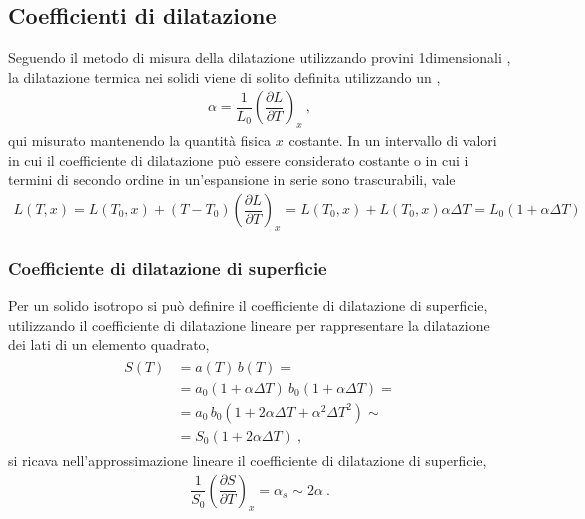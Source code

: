 \documentclass[letterpaper,10pt,italian]{jupyterBook}
\begin{document}
\subsection{Coefficienti di dilatazione}
\label{\detokenize{ch/thermodynamics/elastic-solid-1d:coefficienti-di-dilatazione}}\label{\detokenize{ch/thermodynamics/elastic-solid-1d:physics-hs-thermodynamics-matter-elastic-1d-dilation}}
\sphinxAtStartPar
Seguendo il metodo di misura della dilatazione utilizzando provini 1\sphinxhyphen{}dimensionali  , la dilatazione termica nei solidi viene di solito definita utilizzando un ,
\begin{equation*}
\begin{split}\alpha = \dfrac{1}{L_0}\left( \dfrac{\partial L}{\partial T} \right)_x \ ,\end{split}
\end{equation*}
\sphinxAtStartPar
qui misurato mantenendo la quantità fisica \(x\) costante. In un intervallo di valori in cui il coefficiente di dilatazione può essere considerato costante o in cui i termini di secondo ordine in un’espansione in serie sono trascurabili, vale
\begin{equation*}
\begin{split}L(T,x) = L(T_0,x) + (T-T_0) \left(\dfrac{\partial L}{\partial T}\right)_{x} = L(T_0,x) + L(T_0, x) \alpha \Delta T = L_0 \left( 1 + \alpha \Delta T \right)\end{split}
\end{equation*}

\subsubsection{Coefficiente di dilatazione di superficie}
\label{\detokenize{ch/thermodynamics/elastic-solid-1d:coefficiente-di-dilatazione-di-superficie}}
\sphinxAtStartPar
Per un solido isotropo si può definire il coefficiente di dilatazione di superficie, utilizzando il coefficiente di dilatazione lineare per rappresentare la dilatazione dei lati di un elemento quadrato,
\begin{equation*}
\begin{split}\begin{aligned}
  S(T)
  & = a(T) \, b(T) = \\
  & = a_0 (1 + \alpha \Delta T) \, b_0 (1 + \alpha \Delta T) = \\ 
  & = a_0 \, b_0 (1 + 2 \alpha \Delta T + \alpha^2 \Delta T^2) \sim \\
  & = S_0 ( 1 + 2 \alpha \Delta T ) \ , 
\end{aligned}\end{split}
\end{equation*}
\sphinxAtStartPar
si ricava nell’approssimazione lineare il coefficiente di dilatazione di superficie,
\begin{equation*}
\begin{split}\dfrac{1}{S_0}\left(\dfrac{\partial S}{\partial T}\right)_x = \alpha_s \sim 2 \alpha \ .\end{split}
\end{equation*}
\end{document}
